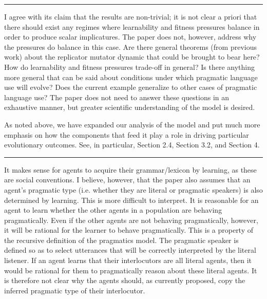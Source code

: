 \documentclass[12pt,a4paper]{article}
\begin{document}
\vspace{0.5cm}

\noindent\rule{\textwidth}{1pt}

\begin{mdframed}[backgroundcolor=gray!25,linecolor=gray!25,frametitle= Reviewer \thereviewerCounter~comment \thereviewerCommentCounter \hfill ~~({\it Model predictions})]
%
I agree with its claim that the results are non-trivial; it is not clear a priori that there should exist any regimes where learnability and fitness pressures balance in order to produce scalar implicatures. The paper does not, however, address why the pressures do balance in this case. Are there general theorems (from previous work) about the replicator mutator dynamic that could be brought to bear here? How do learnability and fitness pressures trade-off in general? Is there anything more general that can be said about conditions under which pragmatic language use will evolve? Does the current example generalize to other cases of pragmatic language use? The paper does not need to answer these questions in an exhaustive manner, but greater scientific understanding of the model is desired.
\end{mdframed}

As noted above, we have expanded our analysis of the model and put much more emphasis on how the components that feed it play a role in driving particular evolutionary outcomes. See, in particular, Section 2.4, Section 3.2, and Section 4.
%

\vspace{0.5cm}

\noindent\rule{\textwidth}{1pt}

\begin{mdframed}[backgroundcolor=gray!25,linecolor=gray!25,frametitle= Reviewer \thereviewerCounter~comment \thereviewerCommentCounter \hfill ~~({\it co-evolution and pragmatic maintenance})]
%
It makes sense for agents to acquire their grammar/lexicon by learning, as these are social conventions. I believe, however, that the paper also assumes that an agent's pragmatic type (i.e. whether they are literal or pragmatic speakers) is also determined by learning. This is more difficult to interpret. It is reasonable for an agent to learn whether the other agents in a population are behaving pragmatically. Even if the other agents are not behaving pragmatically, however, it will be rational for the learner to behave pragmatically. This is a property of the recursive definition of the pragmatics model. The pragmatic speaker is defined so as to select utterances that will be correctly interpreted by the literal listener. If an agent learns that their interlocutors are all literal agents, then it would be rational for them to pragmatically reason about these literal agents. It is therefore not clear why the agents should, as currently proposed, copy the inferred pragmatic type of their interlocutor.
\end{mdframed}
\end{document}
